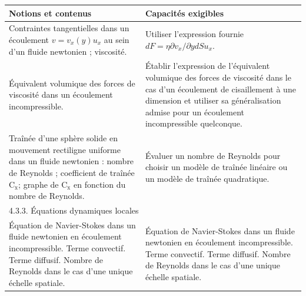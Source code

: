 
\vspace{-0.25cm}
{\footnotesize
\begin{tabularx}{\textwidth}[t]{|X|X|}
  \hline 
  \textbf{Notions et contenus} & \textbf{Capacités exigibles} \\
  \hline
  
  Contraintes tangentielles dans un écoulement $v=v_x(y) u_x$ au sein d'un fluide newtonien ; viscosité. & Utiliser l'expression fournie  $d F=\eta \partial v_x / \partial y d S u_x .$ \\
  \hline 
  Équivalent volumique des forces de viscosité dans un écoulement incompressible. & Établir l'expression de l'équivalent volumique des forces de viscosité dans le cas d'un écoulement de cisaillement à une dimension et utiliser sa généralisation admise pour un écoulement incompressible quelconque. \\
  \hline 
  Traînée d'une sphère solide en mouvement rectiligne uniforme dans un fluide newtonien : nombre de Reynolds ; coefficient de traînée $\mathrm{C}_{\mathrm{x}}$; graphe de $\mathrm{C}_{\mathrm{x}}$ en fonction du nombre de Reynolds. & Évaluer un nombre de Reynolds pour choisir un modèle de traînée linéaire ou un modèle de traînée quadratique. \\
  \hline
  \multicolumn{2}{|l|}{4.3.3. Équations dynamiques locales } \\
  \hline 
  Équation de Navier-Stokes dans un fluide newtonien en écoulement incompressible. Terme convectif. Terme diffusif. Nombre de Reynolds dans le cas d'une unique échelle spatiale. & Équation de Navier-Stokes dans un fluide newtonien en écoulement incompressible. Terme convectif. Terme diffusif. Nombre de Reynolds dans le cas d'une unique échelle spatiale. \\ 
  \hline
\end{tabularx}
}
